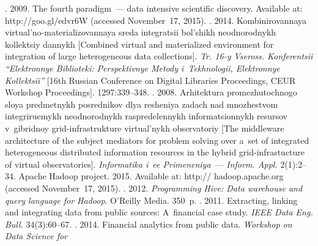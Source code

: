   \begin{multicols}{2}

\renewcommand{\bibname}{\protect\rmfamily References}

{\small\frenchspacing
 {%
 \begin{thebibliography}{99}
. 2009. The fourth paradigm~--- data intensive scientific 
discovery. Available at: {\sf  http://goo.gl/edvr6W} (accessed November~17, 2015).
. 2014. Kombinirovannaya  
virtual'no-materializovannaya sreda integratsii bol'shikh neodnorodnykh kollektsiy dannykh 
[Combined virtual and materialized environment for integration of large heterogeneous data 
collections]. \textit{Tr. 16-y Vseross. Konferentsii ``Elektronnye Biblioteki: Perspektivnye 
Metody i~Tekhnologii, Elektronnye Kollektsii''} [16th Russian Conference on Digital Libraries 
Proceedings, CEUR Workshop Proceedings]. 1297:339--348.
. 2008. 
Arhitektura promezhutochnogo sloya predmetnykh posrednikov dlya resheniya zadach nad 
mnozhestvom integri\-ru\-emykh neodnorodnykh raspredelennykh informatsionnykh resursov 
v~gibridnoy grid-infrastrukture virtual'nykh observatoriy [The middleware architecture of the 
subject mediators for problem solving over a~set of integrated heterogeneous distributed 
information resources in the hybrid grid-infrastucture of virtual observatories]. 
\textit{Informatika i~ee Primeneniya}~--- \textit{Inform. Appl.} 2(1):2--34.
Apache Hadoop project. 2015. Available at: {\sf http:// hadoop.apache.org} (accessed 
November~17, 2015).
. 2012. \textit{Programming Hive: Data 
warehouse and query language for Hadoop}. O'Reilly Media. 350~p.
. 2011. Extracting, linking and integrating 
data from public sources: A~financial case study. \textit{IEEE Data Eng. Bull.} 34(3):60--67.
. 2014. Financial analytics from public data. \textit{Workshop on Data Science for 
}
\end{thebibliography}}}
\end{multicols}
